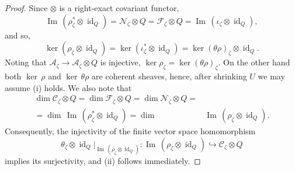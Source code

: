 \documentclass{amsart}
\numberwithin{equation}{section}
\theoremstyle{definition}
\theoremstyle{plain}
\theoremstyle{remark}
\begin{document}
\begin{proof}
Since $\otimes$ is a right-exact covariant functor, 
\[
{{\mathop{\mathrm{Im\,}}}} (\rho^*_\zeta\otimes{{\mathop{\mathrm{id}}}}_{Q})
	={\ensuremath{\mathcal{{N}}}}_\zeta\otimes Q={\ensuremath{\mathcal{{F}}}}_\zeta\otimes Q={{\mathop{\mathrm{Im\,}}}} (\iota_\zeta\otimes{{\mathop{\mathrm{id}}}}_{Q}),
\]
 and so,
\[
\ker (\rho_\zeta\otimes{{\mathop{\mathrm{id}}}}_{Q})=\ker (\iota^*_\zeta\otimes{{\mathop{\mathrm{id}}}}_{Q})=\ker (\theta\rho)_\zeta\otimes{{\mathop{\mathrm{id}}}}_{Q}.
\]
Noting that ${\ensuremath{\mathcal{{A}}}}_\zeta\rightarrow{\ensuremath{\mathcal{{A}}}}_\zeta\otimes Q$
is injective, $\ker \rho_\zeta=\ker (\theta\rho)_\zeta$. On the other hand
both ${{\mathop{\mathrm{ker\,}}}} \rho$ and ${{\mathop{\mathrm{ker\,}}}}\theta\rho$ are coherent sheaves, hence,
 after shrinking $U$ we may assume {(i)} holds.
We also note that
\[
\begin{split}
  \dim {\ensuremath{\mathcal{{C}}}}_\zeta\otimes Q=
  \dim {\ensuremath{\mathcal{{F}}}}_\zeta\otimes Q=
  \dim {\ensuremath{\mathcal{{N}}}}_\zeta\otimes Q=\\ 
  =\dim\, {{\mathop{\mathrm{Im\,}}}} (\rho_\zeta^*\otimes{{\mathop{\mathrm{id}}}}_{Q})=
  \dim\, &{{\mathop{\mathrm{Im\,}}}} (\rho_\zeta\otimes{{\mathop{\mathrm{id}}}}_{Q}).
\end{split}
\]
Consequently, the injectivity of the finite vector space homomorphism 
\[
\theta_\zeta\otimes{{\mathop{\mathrm{id}}}}_{Q}|_{
	{{\mathop{\mathrm{Im\,}}}}(\rho_\zeta\otimes{{\mathop{\mathrm{id}}}}_{Q})}:
{{\mathop{\mathrm{Im\,}}}}(\rho_\zeta\otimes{{\mathop{\mathrm{id}}}}_{Q})\hookrightarrow 
{\ensuremath{\mathcal{{C}}}}_\zeta\otimes Q
\]
implies its surjectivity, and {(ii)} follows immediately.
\end{proof}
\end{document}
